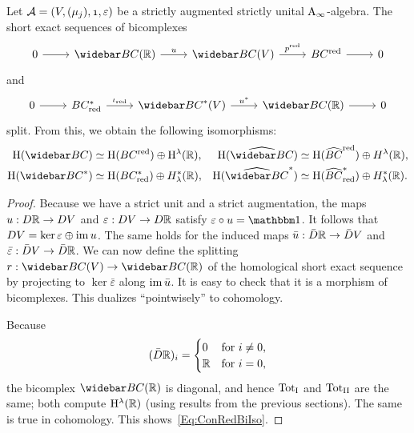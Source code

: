 \documentclass[\MainFolder/Text.tex]{subfiles}
\begin{document}
\begin{Lemma}\label{Lem:ConBiRed}
Let $\mathcal{A}=(V,(\mu_j),\NOne,\varepsilon)$ be a strictly augmented strictly unital $\mathrm{A}_\infty$-algebra. The short exact sequences of bicomplexes
$$\begin{tikzcd}
 0 \arrow{r} &  \NConCycBi(\R) \arrow{r}{u} & \NConCycBi(V)\arrow{r}{p^{\RedMRM}} & \ConCycBi^{\RedMRM} \arrow{r} & 0
\end{tikzcd}$$
and
$$\begin{tikzcd}
 0 \arrow{r} & \ConCycBi_{\RedMRM}^* \arrow{r}{\iota_{\RedMRM}} & \NConCycBi^*(V) \arrow{r}{u^*} & \NConCycBi(\R) \arrow{r} & 0
\end{tikzcd}$$
split. From this, we obtain the following isomorphisms:
\begin{equation}\label{Eq:ConRedBiIso}
\begin{aligned}
\H(\NConCycBi)&\simeq  \H(\ConCycBi^{\RedMRM}) \oplus \H^\lambda(\R), & \H( \widehat{\NConCycBi}) &\simeq  \H(\widehat{\ConCycBi}^{\RedMRM})\oplus H^\lambda(\R), \\
\H(\NConCycBi^*) &\simeq \H(\ConCycBi^*_{\RedMRM}) \oplus H_\lambda^*(\R), & \H(\widehat{\NConCycBi}^*) &\simeq  \H(\widehat{\ConCycBi}^*_{\RedMRM})\oplus H_\lambda^*(\R).
\end{aligned}
\end{equation}
\end{Lemma}
\begin{proof}
Because we have a strict unit and a strict augmentation, the maps $u: D \mathbb{R} \rightarrow D V$ and $\varepsilon: D V \rightarrow D \mathbb{R}$ satisfy $\varepsilon \circ u = \Id$. It follows that $D V = \ker\varepsilon\oplus\operatorname{im} u$. The same holds for the induced maps $\bar{u}: \bar{D} \mathbb{R} \rightarrow \bar{D} V$ and $\bar{\varepsilon}: \bar{D} V \rightarrow \bar{D} \mathbb{R}$. We can now define the splitting $r: \NConCycBi(V) \rightarrow \NConCycBi(\R)$ of the homological short exact sequence by projecting to $\ker \bar{\varepsilon}$ along $\operatorname{im} \bar{u}$. It is easy to check that it is a morphism of bicomplexes. This dualizes ``pointwisely'' to cohomology.

Because 
$$ (\bar{D} \mathbb{R})_i = \begin{cases} 0 & \text{for }i \neq 0, \\ \mathbb{R} & \text{for } i = 0, \end{cases} $$
the bicomplex $\NConCycBi(\R)$ is diagonal, and hence ${\mathrm{Tot}_{\mathrm{I}}}$ and ${\mathrm{Tot}_{\mathrm{II}}}$ are the same; both compute $\mathrm{H}^\lambda(\mathbb{R})$ (using results from the previous sections). The same is true in cohomology. This shows~\eqref{Eq:ConRedBiIso}.
\end{proof} 
\end{document}

